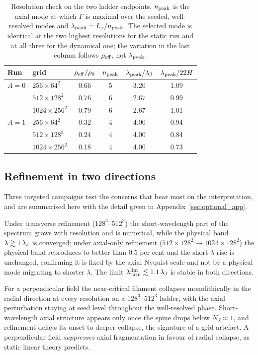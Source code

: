 \documentclass[usenatbib,twoside,twocolumn]{mnras}
\begin{document}
\begin{table}
\caption{Resolution check on the two ladder endpoints. $n_{\rm peak}$ is the axial mode at which $\Gamma$ is maximal over the seeded, well-resolved modes and $\lambda_{\rm peak}=L_x/n_{\rm peak}$. The selected mode is identical at the two highest resolutions for the static run and at all three for the dynamical one; the variation in the last column follows $\rho_{\rm eff}$, not $\lambda_{\rm peak}$.}
\label{tab:xlconv}
\footnotesize
\setlength{\tabcolsep}{4pt}
\begin{tabular}{llcccc}
\toprule
Run & grid & $\rho_{\rm eff}/\rho_0$ & $n_{\rm peak}$ & $\lambda_{\rm peak}/\lambda_{\rm J}$ & $\lambda_{\rm peak}/22H$ \\
\midrule
$A=0$ & $256\times64^2$   & 0.66 & 5 & 3.20 & 1.09 \\
      & $512\times128^2$  & 0.76 & 6 & 2.67 & 0.99 \\
      & $1024\times256^2$ & 0.79 & 6 & 2.67 & 1.01 \\
\midrule
$A=1$ & $256\times64^2$   & 0.32 & 4 & 4.00 & 0.94 \\
      & $512\times128^2$  & 0.24 & 4 & 4.00 & 0.84 \\
      & $1024\times256^2$ & 0.18 & 4 & 4.00 & 0.73 \\
\bottomrule
\end{tabular}
\end{table}

\subsection{Refinement in two directions}
\label{sec:optional_tests}

Three targeted campaigns test the concerns that bear most on the interpretation, and are summarised here with the detail given in Appendix~\ref{sec:optional_app}.

Under transverse refinement ($128^3$--$512^3$) the short-wavelength part of the spectrum grows with resolution and is numerical, while the physical band $\lambda\gtrsim1\,\lambda_{\rm J}$ is converged; under axial-only refinement ($512\times128^2\to1024\times128^2$) the physical band reproduces to better than $0.5$ per cent and the short-$\lambda$ rise is unchanged, confirming it is fixed by the axial Nyquist scale and not by a physical mode migrating to shorter $\lambda$. The limit $\lambda_{\rm turn}^{\rm lim}\lesssim1.1\,\lambda_{\rm J}$ is stable in both directions.

For a perpendicular field the near-critical filament collapses monolithically in the radial direction at every resolution on a $128^3$--$512^3$ ladder, with the axial perturbation staying at seed level throughout the well-resolved phase. Short-wavelength axial structure appears only once the spine drops below $N_J\approx1$, and refinement delays its onset to deeper collapse, the signature of a grid artefact. A perpendicular field \emph{suppresses} axial fragmentation in favour of radial collapse, as static linear theory predicts.
\end{document}
